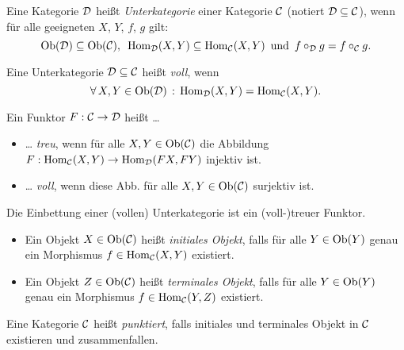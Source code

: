 \documentclass{cheat-sheet}
\begin{document}


\begin{defn}
  Eine Kategorie $\mathcal{D}$ heißt \emph{Unterkategorie} einer Kategorie $\mathcal{C}$ (notiert $\mathcal{D} \subseteq \mathcal{C}$), wenn für alle geeigneten $X$, $Y$, $f$, $g$ gilt:
  \[
    \operatorname{Ob}(\mathcal{D}) \subseteq \operatorname{Ob}(\mathcal{C}), \enspace
    \operatorname{Hom}_{\mathcal{D}}(X, Y) \subseteq \operatorname{Hom}_{\mathcal{C}}(X, Y) \enspace \text{und} \enspace
    f \circ_{\mathcal{D}} g = f \circ_{\mathcal{C}} g.
  \]
\end{defn}

\begin{defn}
  Eine Unterkategorie $\mathcal{D} \subseteq \mathcal{C}$ heißt \emph{voll}, wenn
  \[ \forall \, {X, Y \in \operatorname{Ob}(\mathcal{D})} \,:\, \operatorname{Hom}_{\mathcal{D}}(X, Y) = \operatorname{Hom}_{\mathcal{C}}(X, Y). \]
\end{defn}

\begin{defn}
  Ein Funktor $F : \mathcal{C} \to \mathcal{D}$ heißt \ldots
  \begin{itemize}
    \item \ldots{} \emph{treu}, wenn für alle $X, Y \in \operatorname{Ob}(\mathcal{C})$ die Abbildung
    $F : \operatorname{Hom}_{\mathcal{C}}(X, Y) \to \operatorname{Hom}_{\mathcal{D}}(FX, FY)$
    injektiv ist.
    \item \ldots{} \emph{voll}, wenn diese Abb. für alle $X, Y \in \operatorname{Ob}(\mathcal{C})$ surjektiv ist.
  \end{itemize}
\end{defn}

\begin{bem}
  Die Einbettung einer (vollen) Unterkategorie ist ein (voll-)treuer Funktor.
\end{bem}

\begin{defn}
  \begin{itemize}
    \item Ein Objekt $X \in \operatorname{Ob}(\mathcal{C})$ heißt \emph{initiales Objekt}, falls für alle $Y \in \operatorname{Ob}(Y)$ genau ein Morphismus $f \in \operatorname{Hom}_{\mathcal{C}}(X, Y)$ existiert.
    \item Ein Objekt $Z \in \operatorname{Ob}(\mathcal{C})$ heißt \emph{terminales Objekt}, falls für alle $Y \in \operatorname{Ob}(Y)$ genau ein Morphismus $f \in \operatorname{Hom}_{\mathcal{C}}(Y, Z)$ existiert.
  \end{itemize}
\end{defn}

\begin{defn}
  Eine Kategorie $\mathcal{C}$ heißt \emph{punktiert}, falls initiales und terminales Objekt in $\mathcal{C}$ existieren und zusammenfallen.
\end{defn}
\end{document}
